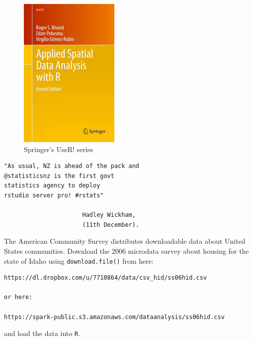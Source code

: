 \documentclass{beamer}
\begin{document}
\begin{frame}
	
	
	
	
	\begin{figure}
\centering
\includegraphics[width=0.45\linewidth]{"ASDAbook cover"}
\caption{Springer's UseR! series}
\end{figure}

\end{frame}
\begin{frame}[fragile]
\Large
\begin{framed}
\begin{verbatim}
"As usual, NZ is ahead of the pack and 
@statisticsnz is the first govt 
statistics agency to deploy 
rstudio server pro! #rstats"

                      Hadley Wickham, 
                      (11th December).
\end{verbatim}
\end{framed}

\end{frame}

	
\begin{frame}[fragile]
The American Community Survey distributes downloadable data about United States communities. 
Download the 2006 microdata survey about housing for the state of Idaho using \texttt{download.file()} from here: 

\begin{verbatim}
https://dl.dropbox.com/u/7710864/data/csv_hid/ss06hid.csv

or here:

https://spark-public.s3.amazonaws.com/dataanalysis/ss06hid.csv 
\end{verbatim}
and load the data into \texttt{R}. 
\end{frame}
\end{document}
